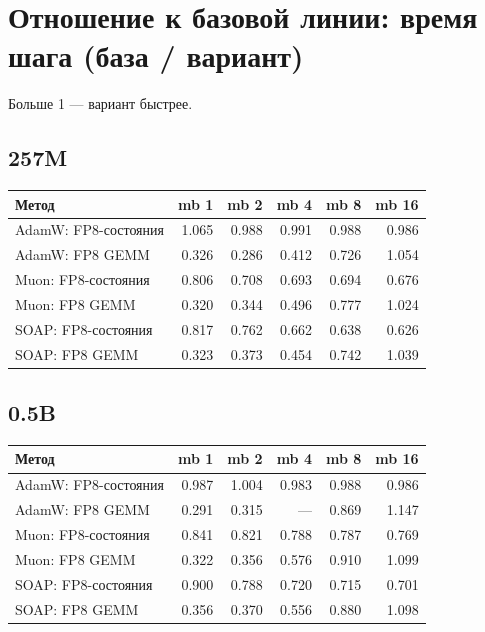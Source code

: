 \documentclass[10pt]{article}
\begin{document}
\section{Отношение к базовой линии: время шага (база / вариант)}
Больше 1 --- вариант быстрее.
\subsection{257M}
\begin{center}
\small
\begin{tabular}{lrrrrr}
\toprule
\textbf{Метод} & \textbf{mb 1} & \textbf{mb 2} & \textbf{mb 4} & \textbf{mb 8} & \textbf{mb 16} \\
\midrule
AdamW: FP8-состояния & 1.065 & 0.988 & 0.991 & 0.988 & 0.986 \\
AdamW: FP8 GEMM & 0.326 & 0.286 & 0.412 & 0.726 & 1.054 \\
Muon: FP8-состояния & 0.806 & 0.708 & 0.693 & 0.694 & 0.676 \\
Muon: FP8 GEMM & 0.320 & 0.344 & 0.496 & 0.777 & 1.024 \\
SOAP: FP8-состояния & 0.817 & 0.762 & 0.662 & 0.638 & 0.626 \\
SOAP: FP8 GEMM & 0.323 & 0.373 & 0.454 & 0.742 & 1.039 \\
\bottomrule
\end{tabular}
\end{center}
\subsection{0.5B}
\begin{center}
\small
\begin{tabular}{lrrrrr}
\toprule
\textbf{Метод} & \textbf{mb 1} & \textbf{mb 2} & \textbf{mb 4} & \textbf{mb 8} & \textbf{mb 16} \\
\midrule
AdamW: FP8-состояния & 0.987 & 1.004 & 0.983 & 0.988 & 0.986 \\
AdamW: FP8 GEMM & 0.291 & 0.315 & --- & 0.869 & 1.147 \\
Muon: FP8-состояния & 0.841 & 0.821 & 0.788 & 0.787 & 0.769 \\
Muon: FP8 GEMM & 0.322 & 0.356 & 0.576 & 0.910 & 1.099 \\
SOAP: FP8-состояния & 0.900 & 0.788 & 0.720 & 0.715 & 0.701 \\
SOAP: FP8 GEMM & 0.356 & 0.370 & 0.556 & 0.880 & 1.098 \\
\bottomrule
\end{tabular}
\end{center}
\end{document}
